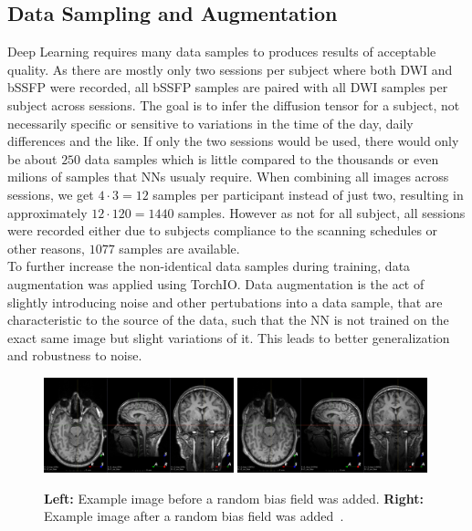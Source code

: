 \subsection{Data Sampling and Augmentation}
Deep Learning requires many data samples to produces results of acceptable quality.
As there are mostly only two sessions per subject where both DWI and bSSFP were recorded, all bSSFP samples are paired with all DWI samples per subject across sessions.
The goal is to infer the diffusion tensor for a subject, not necessarily specific or sensitive to variations in the time of the day, daily differences and the like.
If only the two sessions would be used, there would only be about $250$ data samples which is little compared to the thousands or even milions of samples that NNs usualy require.
When combining all images across sessions, we get $4 \cdot 3 = 12$ samples per participant instead of just two, resulting in approximately $12 \cdot 120 = 1440$ samples.
However as not for all subject, all sessions were recorded either due to subjects compliance to the scanning schedules or other reasons, $1077$ samples are available. \\

To further increase the non-identical data samples during training, data augmentation was applied using TorchIO.
Data augmentation is the act of slightly introducing noise and other pertubations into a data sample, that are characteristic to the source of the data, such that the NN is not trained on the exact same image but slight variations of it.
This leads to better generalization and robustness to noise.

\begin{figure}[h]
   \begin{center}
      \includegraphics[keepaspectratio, width=0.49\textwidth]{img/random_bias_field-0.png}
      \includegraphics[keepaspectratio, width=0.49\textwidth]{img/random_bias_field-1.png}
   \end{center}
   \caption{
      \textbf{Left:} Example image before a random bias field was added.
      \textbf{Right:} Example image after a random bias field was added~\autocite{noauthor_augmentation_nodate}.
   }
   \label{bias-field}
\end{figure}

